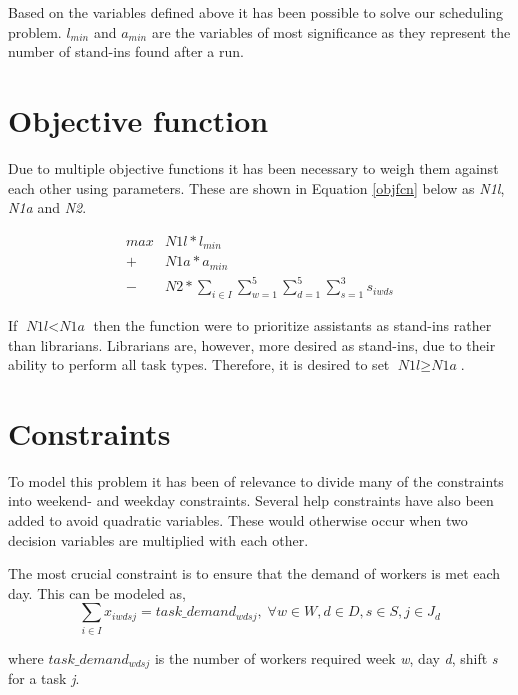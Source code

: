 
Based on the variables defined above it has been possible to solve our scheduling problem. \textit{$l_{min}$} and \textit{$a_{min}$} are the variables of most significance as they represent the number of stand-ins found after a run. 

\section{Objective function}
Due to multiple objective functions it has been necessary to weigh them against each other using parameters. These are shown in Equation \ref{objfcn} below as \textit{N1l}, \textit{N1a} and \textit{N2}.

\begin{equation} \label{objfcn}
\begin{split}
max &N1l*l_{min}\\
 + &N1a*a_{min} \\
 - &N2*\sum_{i \in I}\sum_{w = 1}^{5}\sum_{d = 1}^{5}\sum_{s = 1}^{3} s_{iwds}
\end{split}
\end{equation}

If $\textit{N1l} < \textit{N1a}$ then the function were to prioritize assistants as stand-ins rather than librarians. Librarians are, however, more desired as stand-ins, due to their ability to perform all task types. Therefore, it is desired to set $\textit{N1l} \geq \textit{N1a}$.

\section{Constraints} \label{constraints}
To model this problem it has been of relevance to divide many of the constraints into weekend- and weekday constraints. Several help constraints have also been added to avoid quadratic variables. These would otherwise occur when two decision variables are multiplied with each other.

The most crucial constraint is to ensure that the demand of workers is met each day. This can be modeled as,
\begin{equation}
\sum_{i \in I} x_{iwdsj} = task\_demand_{wdsj}, \; \forall w\in W,d\in D,s\in S,j\in J_d
\end{equation}

where $task\_demand_{wdsj}$ is the number of workers required week \textit{w}, day \textit{d}, shift \textit{s} for a task \textit{j}.

